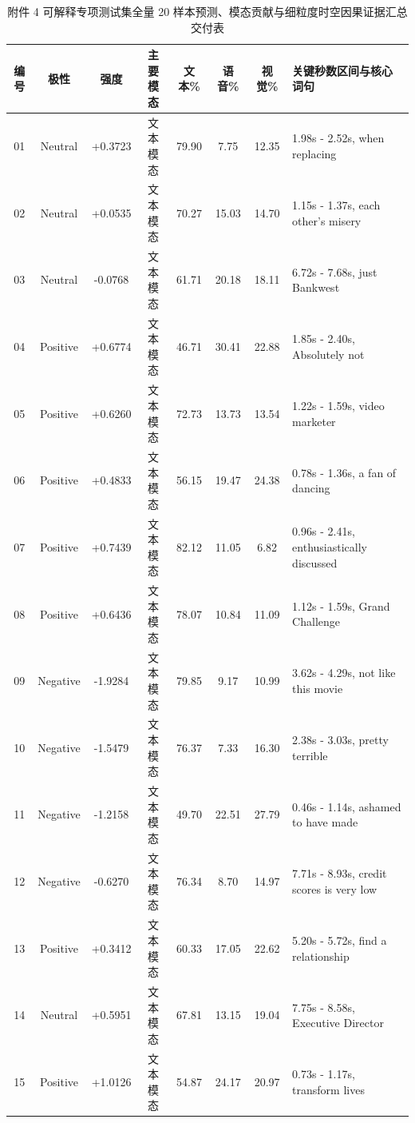 \begin{table}[htp!]
\centering
\small
\renewcommand\arraystretch{1.2}
\caption{附件 4 可解释专项测试集全量 20 样本预测、模态贡献与细粒度时空因果证据汇总交付表}
\label{tab:att4_full}
\begin{tabularx}{\textwidth}{|c|c|c|c|c|c|c|X|}
\hline
\textbf{编号} & \textbf{极性} & \textbf{强度} & \textbf{主要模态} & \textbf{文本\%} & \textbf{语音\%} & \textbf{视觉\%} & \textbf{关键秒数区间与核心词句} \\ \hline
01 & Neutral & +0.3723 & 文本模态 & 79.90 & 7.75 & 12.35 & 1.98s - 2.52s, when replacing \\ \hline
02 & Neutral & +0.0535 & 文本模态 & 70.27 & 15.03 & 14.70 & 1.15s - 1.37s, each other's misery \\ \hline
03 & Neutral & -0.0768 & 文本模态 & 61.71 & 20.18 & 18.11 & 6.72s - 7.68s, just Bankwest \\ \hline
04 & Positive & +0.6774 & 文本模态 & 46.71 & 30.41 & 22.88 & 1.85s - 2.40s, Absolutely not \\ \hline
05 & Positive & +0.6260 & 文本模态 & 72.73 & 13.73 & 13.54 & 1.22s - 1.59s, video marketer \\ \hline
06 & Positive & +0.4833 & 文本模态 & 56.15 & 19.47 & 24.38 & 0.78s - 1.36s, a fan of dancing \\ \hline
07 & Positive & +0.7439 & 文本模态 & 82.12 & 11.05 & 6.82 & 0.96s - 2.41s, enthusiastically discussed \\ \hline
08 & Positive & +0.6436 & 文本模态 & 78.07 & 10.84 & 11.09 & 1.12s - 1.59s, Grand Challenge \\ \hline
09 & Negative & -1.9284 & 文本模态 & 79.85 & 9.17 & 10.99 & 3.62s - 4.29s, not like this movie \\ \hline
10 & Negative & -1.5479 & 文本模态 & 76.37 & 7.33 & 16.30 & 2.38s - 3.03s, pretty terrible \\ \hline
11 & Negative & -1.2158 & 文本模态 & 49.70 & 22.51 & 27.79 & 0.46s - 1.14s, ashamed to have made \\ \hline
12 & Negative & -0.6270 & 文本模态 & 76.34 & 8.70 & 14.97 & 7.71s - 8.93s, credit scores is very low \\ \hline
13 & Positive & +0.3412 & 文本模态 & 60.33 & 17.05 & 22.62 & 5.20s - 5.72s, find a relationship \\ \hline
14 & Neutral & +0.5951 & 文本模态 & 67.81 & 13.15 & 19.04 & 7.75s - 8.58s, Executive Director \\ \hline
15 & Positive & +1.0126 & 文本模态 & 54.87 & 24.17 & 20.97 & 0.73s - 1.17s, transform lives \\ \hline

\end{tabularx}
\end{table}
